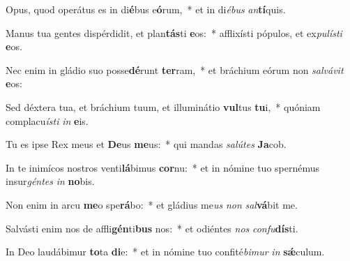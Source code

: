 \item Opus, quod operátus es in di\textbf{é}bus e\textbf{ó}rum,~* et in di\textit{é}\textit{bus} \textit{an}\textbf{tí}quis.
\item Manus tua gentes dispérdidit, et plan\textbf{tás}ti \textbf{e}os:~* afflixísti pópulos, et ex\textit{pu}\textit{lís}\textit{ti} \textbf{e}os.
\item Nec enim in gládio suo posse\textbf{dé}runt \textbf{ter}ram,~* et bráchium eórum non \textit{sal}\textit{vá}\textit{vit} \textbf{e}os:
\item Sed déxtera tua, et bráchium tuum, et illuminátio \textbf{vul}tus \textbf{tu}i,~* quóniam complacu\textit{ís}\textit{ti} \textit{in} \textbf{e}is.
\item Tu es ipse Rex meus et \textbf{De}us \textbf{me}us:~* qui mandas \textit{sa}\textit{lú}\textit{tes} \textbf{Ja}cob.
\item In te inimícos nostros venti\textbf{lá}bimus \textbf{cor}nu:~* et in nómine tuo spernémus insur\textit{gén}\textit{tes} \textit{in} \textbf{no}bis.
\item Non enim in arcu \textbf{me}o spe\textbf{rá}bo:~* et gládius me\textit{us} \textit{non} \textit{sal}\textbf{vá}bit me.
\item Salvásti enim nos de affli\textbf{gén}ti\textbf{bus} nos:~* et odiéntes \textit{nos} \textit{con}\textit{fu}\textbf{dís}ti.
\item In Deo laudábimur \textbf{to}ta \textbf{di}e:~* et in nómine tuo confité\textit{bi}\textit{mur} \textit{in} \textbf{sǽ}culum.
